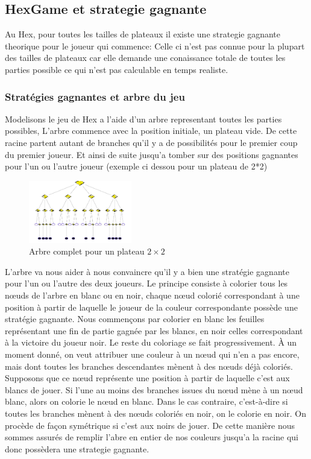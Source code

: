 \subsection{HexGame et strategie gagnante}

Au Hex, pour toutes les tailles de plateaux il existe une strategie gagnante theorique pour le joueur qui commence:
Celle ci n'est pas connue pour la plupart des tailles de plateaux car elle demande une conaissance totale de toutes 
les parties possible ce qui n'est pas calculable en temps realiste.

\subsubsection{Stratégies gagnantes et arbre du jeu}
Modelisons le jeu de Hex a l'aide d'un arbre representant toutes les parties possibles, L'arbre commence avec la position 
initiale, un plateau vide. De cette racine partent autant de branches qu'il y a de possibilités pour 
le premier coup du premier joueur. Et ainsi de suite jusqu'a tomber sur des positions gagnantes pour l'un ou l'autre joueur
(exemple ci dessou pour un plateau de 2*2)
\begin{figure}[h]
    \begin{center}
        \includegraphics[width=0.4\textwidth]{root/strategie_gagnante.png}
    \end{center}
    \caption{Arbre complet pour un plateau $2\times2$}\label{fig:strategie_gagnante}
\end{figure}

L'arbre va nous aider à nous convaincre qu'il y a bien une stratégie gagnante pour l'un ou l'autre
des deux joueurs. Le principe consiste à colorier tous les nœuds de l'arbre en blanc ou en noir, chaque
nœud colorié correspondant à une position à partir de laquelle le joueur de la couleur correspondante
possède une stratégie gagnante. 
Nous commençons par colorier en blanc les feuilles représentant une fin de
partie gagnée par les blancs, en noir celles correspondant à la victoire du joueur noir.
Le reste du coloriage se fait progressivement. À un moment donné, on veut attribuer une couleur
à un nœud qui n'en a pas encore, mais dont toutes les branches descendantes mènent à des nœuds
déjà coloriés. Supposons que ce nœud représente une position à partir de laquelle c'est aux blancs de
jouer. Si l'une au moins des branches issues du nœud mène à un nœud blanc, alors on colorie le nœud
en blanc. Dans le cas contraire, c'est-à-dire si toutes les branches mènent à des nœuds coloriés en
noir, on le colorie en noir. On procède de façon symétrique si c'est aux noirs de jouer.
De cette manière nous sommes assurés de remplir l'abre en entier de nos couleurs jusqu'a la racine
qui donc possèdera une strategie gagnante.



